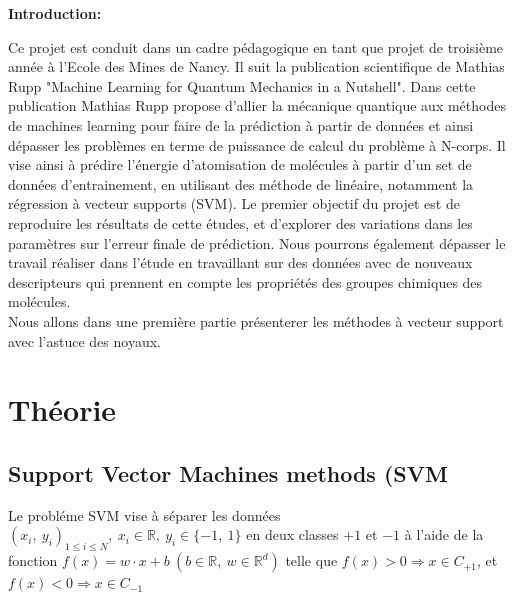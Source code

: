\documentclass[a4paper,12pt,titlepage]{report}
\begin{document}
\tableofcontents

\newpage



\textbf{\Huge Introduction:} \\
\newline

Ce projet est conduit dans un cadre pédagogique en tant que projet de troisième année à l'Ecole des Mines de Nancy. Il suit la publication scientifique de Mathias Rupp "Machine Learning for Quantum Mechanics in a Nutshell". Dans cette publication Mathias Rupp propose d'allier la mécanique quantique aux méthodes de machines learning pour faire de la prédiction à partir de données et ainsi dépasser les problèmes en terme de puissance de calcul du problème à N-corps. Il vise ainsi à prédire l'énergie d'atomisation de molécules à partir d'un set de données d'entrainement, en utilisant des méthode de  linéaire, notamment la régression à vecteur supports (SVM). 
Le premier objectif du projet est de reproduire les résultats de cette études, et d'explorer des variations dans les paramètres sur l'erreur finale de prédiction. Nous pourrons également dépasser le travail réaliser dans l'étude en travaillant sur des données avec de nouveaux descripteurs qui prennent en compte les propriétés des groupes chimiques des molécules.\\
Nous allons dans une première partie présenterer les méthodes à vecteur support avec l'astuce des noyaux.

\chapter{Théorie}
\label{C1}
\section{Support Vector Machines methods (SVM}
Le probléme SVM vise à séparer les données $(x_{i},\ y_{i})_{1 \leqslant i \leqslant N},\ x_{i} \in \mathbb{R}, \ y_{i} \in \{-1,\ 1\}$ en deux classes $+1$ et $-1$ à l'aide de la fonction $f(x) = w \cdot x + b \ (b \in \mathbb{R},\ w \in  \mathbb{R}^{d})$ telle que $f(x) > 0 \Rightarrow x \in C_{+1}$, et $f(x) < 0 \Rightarrow x \in C_{-1}$
\end{document}
